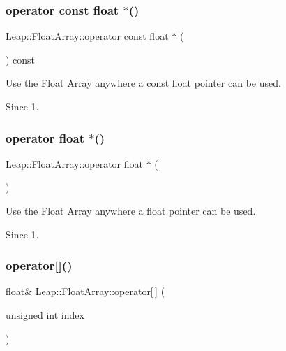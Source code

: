 \subsubsection{\texorpdfstring{operator const float $\ast$()}{operator const float *()}}
{\footnotesize\ttfamily Leap\+::\+Float\+Array\+::operator const float $\ast$ (\begin{DoxyParamCaption}{ }\end{DoxyParamCaption}) const\hspace{0.3cm}{\ttfamily [inline]}}

Use the Float Array anywhere a const float pointer can be used. \begin{DoxySince}{Since}
1. 
\end{DoxySince}
\mbox{\label{struct_leap_1_1_float_array_ad2e74b6ec198761806cc2d3c8bd28c74}} 
\subsubsection{\texorpdfstring{operator float $\ast$()}{operator float *()}}
{\footnotesize\ttfamily Leap\+::\+Float\+Array\+::operator float $\ast$ (\begin{DoxyParamCaption}{ }\end{DoxyParamCaption})\hspace{0.3cm}{\ttfamily [inline]}}

Use the Float Array anywhere a float pointer can be used. \begin{DoxySince}{Since}
1. 
\end{DoxySince}
\mbox{\label{struct_leap_1_1_float_array_a9c4977609b3c6026fa9fd9091de35c1d}} 
\subsubsection{\texorpdfstring{operator[]()}{operator[]()}}
{\footnotesize\ttfamily float\& Leap\+::\+Float\+Array\+::operator\mbox{[}$\,$\mbox{]} (\begin{DoxyParamCaption}\item[{unsigned int}]{index }\end{DoxyParamCaption})\hspace{0.3cm}{\ttfamily [inline]}}

